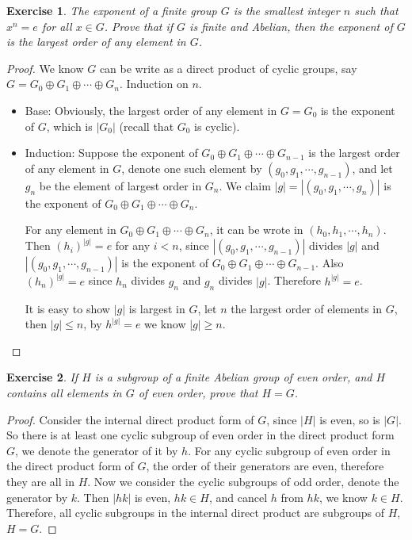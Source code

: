 \documentclass[14pt]{extarticle}
\newtheorem{exercise}{Exercise}[section]
\newcommand{\join}[3][,]{#2_0 #1 #2_1 #1 \cdots #1 #2_{#3}}
\newcommand{\Oplus}[2]{\join[\oplus]{#1}{#2}}
\newcommand{\1}{\{e\}}
\begin{document}
\setcounter{exercise}{44}
\begin{exercise}
  The exponent of a finite group $G$ is the smallest integer $n$
  such that $x^n = e$ for all $x \in G$.
  Prove that if $G$ is finite and Abelian, then the exponent of $G$
  is the largest order of any element in $G$.
\end{exercise}
\begin{proof}
  We know $G$ can be write as a direct product of cyclic groups,
  say $G = \Oplus{G}{n}$. Induction on $n$.
  \begin{itemize}
    \item Base: Obviously, the largest order of any element in $G = G_0$ 
      is the exponent of $G$, which is $|G_0|$ (recall that $G_0$ is cyclic).
    \item Induction: Suppose the exponent of $\Oplus{G}{n - 1}$ is 
      the largest order of any element in $G$, 
      denote one such element by $(\join{g}{n - 1})$,
      and let $g_n$ be the element of largest order in $G_n$.
      We claim $|g| = |(\join{g}{n})|$ is
      the exponent of $\Oplus{G}{n}$.

      For any element in $\Oplus{G}{n}$, it can be wrote in $(\join{h}{n})$.
      Then $(h_i)^{|g|} = e$ for any $i < n$, since $|(\join{g}{n - 1})|$ divides $|g|$
      and $|(\join{g}{n - 1})|$ is the exponent of $\Oplus{G}{n - 1}$.
      Also $(h_n)^{|g|} = e$ since $h_n$ divides $g_n$ and $g_n$ divides $|g|$.
      Therefore $h^{|g|} = e$.

      It is easy to show $|g|$ is largest in $G$, 
      let $n$ the largest order of elements in $G$,
      then $|g| \leq n$, by $h^{|g|} = e$ we know $|g| \geq n$.
  \end{itemize}
\end{proof}

\begin{exercise}
  If $H$ is a subgroup of a finite Abelian group of even order,
  and $H$ contains all elements in $G$ of even order, prove that $H = G$.
\end{exercise}
\begin{proof}
  Consider the internal direct product form of $G$,
  since $|H|$ is even, so is $|G|$.
  So there is at least one cyclic subgroup of even order in the direct product form $G$,
  we denote the generator of it by $h$.
  For any cyclic subgroup of even order in the direct product form of $G$,
  the order of their generators are even, therefore they are all in $H$.
  Now we consider the cyclic subgroups of odd order, denote the generator by $k$.
  Then $|hk|$ is even, $hk \in H$, and cancel $h$ from $hk$, we know $k \in H$.
  Therefore, all cyclic subgroups in the internal direct product are subgroups of $H$,
  $H = G$.
\end{proof}
\end{document}
